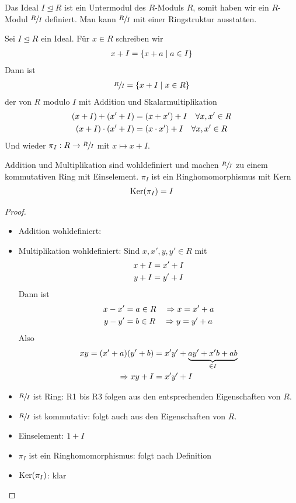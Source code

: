 \begin{remark}
	Das Ideal $I\unlhd R$ ist ein Untermodul des $R$-Moduls $R$, somit haben wir ein $R$-Modul $\sfrac{R}{I}$ definiert. Man kann $\sfrac{R}{I}$ mit einer Ringstruktur ausstatten.
\end{remark}

\begin{definition}[Quotientenring]
	Sei $I\unlhd R$ ein Ideal. Für $x\in R$ schreiben wir 
	\begin{align}
		x+I=\{x+a\mid a\in I\}\notag
	\end{align}
	Dann ist
	\begin{align}
		\sfrac{R}{I}=\{x+I\mid x\in R\}\notag
	\end{align}
	der  von $R$ modulo $I$ mit Addition und Skalarmultiplikation
	\begin{align}
		(x+I)+(x'+I) &= (x+x')+I\quad\forall x,x'\in R \notag \\
		(x+I)\cdot (x'+I) &= (x\cdot x')+I\quad\forall x,x'\in R\notag
	\end{align}
	Und wieder $\pi_I:R\to\sfrac{R}{I}$ mit $x\mapsto x+I$.
\end{definition}

\begin{lemma}
	Addition und Multiplikation sind wohldefiniert und machen $\sfrac{R}{I}$ zu einem kommutativen Ring mit Einselement. $\pi_I$ ist ein Ringhomomorphismus mit Kern
	\begin{align}
		\operatorname{Ker}(\pi_I) = I\notag
	\end{align}
\end{lemma}
\begin{proof}
	\begin{itemize}
		\item Addition wohldefiniert: 
		\item Multiplikation wohldefiniert: Sind $x,x',y,y'\in R$ mit
		\begin{align}
			x+I &= x'+I\notag \\
			y+I &= y'+I\notag
		\end{align}
		Dann ist
		\begin{align}
			x-x' &= a\in R \quad\Rightarrow x = x'+a\notag \\
			y-y' &= b\in R \quad\Rightarrow y = y'+a\notag
		\end{align}
		Also
		\begin{align}
			xy = (x'+a)(y'+b) &= x'y'+\underbrace{ay'+x'b+ab}_{\in I}\notag \\
			\Rightarrow xy+I &= x'y'+I\notag
		\end{align}
		\item $\sfrac{R}{I}$ ist Ring: R1 bis R3 folgen aus den entsprechenden Eigenschaften von $R$.
		\item $\sfrac{R}{I}$ ist kommutativ: folgt auch aus den Eigenschaften von $R$.
		\item Einselement: $1+I$
		\item $\pi_I$ ist ein Ringhomomorphismus: folgt nach Definition
		\item $\operatorname{Ker}(\pi_I)$: klar
	\end{itemize}
\end{proof}

